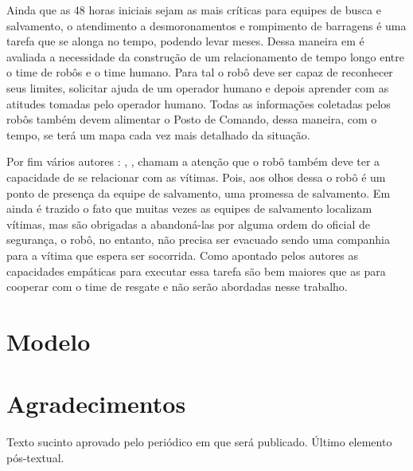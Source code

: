 \documentclass[
	article,			%
	11pt,				%
	oneside,			%
	a4paper,			%
	english,			%
	brazil,				%
	sumario=tradicional	
	]{abntex2}
\begin{document}
Ainda que as 48 horas iniciais sejam as mais críticas para equipes de busca e salvamento, o atendimento a desmoronamentos e rompimento de barragens é uma tarefa que se alonga no tempo, podendo levar meses. Dessa maneira em \cite{krui2015} é avaliada a necessidade da construção de um relacionamento de tempo longo entre o time de robôs e o time humano. Para tal o robô deve ser capaz de reconhecer seus limites, solicitar ajuda de um operador humano e depois aprender com as atitudes tomadas pelo operador humano. Todas as informações coletadas pelos robôs também devem alimentar o Posto de Comando, dessa maneira, com o tempo, se terá um mapa cada vez mais detalhado da situação.

Por fim vários autores : \cite{Robin2004}, \cite{akgun2022using}, \cite{habib2011} chamam a atenção que o robô também deve ter a capacidade de se relacionar com as vítimas. Pois, aos olhos dessa o robô é um ponto de presença da equipe de salvamento, uma promessa de salvamento. Em \cite{Robin2004} ainda é trazido o fato que muitas vezes as equipes de salvamento localizam vítimas, mas são obrigadas a abandoná-las por alguma ordem do oficial de segurança, o robô, no entanto, não precisa ser evacuado sendo uma companhia para a vítima que espera ser socorrida. Como apontado pelos autores as capacidades empáticas para executar essa tarefa são bem maiores que as para cooperar com o time de resgate e não serão abordadas nesse trabalho.

\section{Modelo}



\postextual




\section*{Agradecimentos}
Texto sucinto aprovado pelo periódico em que será publicado. Último 
elemento pós-textual.
\end{document}
